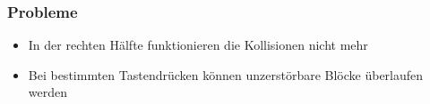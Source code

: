 \documentclass[18pt]{beamer}
\begin{document}
	\begin{frame}
		\frametitle{Probleme}
		\begin{itemize}
			\item In der rechten Hälfte funktionieren die Kollisionen nicht mehr
			\item Bei bestimmten Tastendrücken können unzerstörbare Blöcke überlaufen werden
		\end{itemize}
\end{frame}
		
\end{document}
